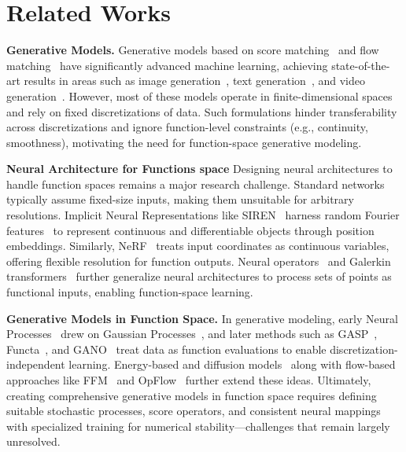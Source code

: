 \section{Related Works}

\noindent \textbf{Generative Models.}
Generative models based on score matching~\cite{ho2020denoising,Song2021a} and flow matching~\cite{lipman2023flow,tong2024improving} have significantly advanced machine learning, 
achieving state-of-the-art results in areas such as image generation~\cite{rombach2022high}, text generation~\cite{gat2024discrete}, and video generation~\cite{Ho2022video,polyak2024moviegencastmedia}. 
However, most of these models operate in finite-dimensional spaces and rely on fixed discretizations of data. 
Such formulations hinder transferability across discretizations and ignore function-level constraints (e.g., continuity, smoothness), 
motivating the need for function-space generative modeling.

\noindent \textbf{Neural Architecture for Functions space}
Designing neural architectures to handle function spaces remains a major research challenge. 
Standard networks typically assume fixed-size inputs, making them unsuitable for arbitrary resolutions. 
Implicit Neural Representations like SIREN~\cite{sitzmann2020implicit} harness random Fourier features~\cite{rahimi2007random} to represent continuous and differentiable objects through position embeddings. 
Similarly, NeRF~\cite{mildenhall2021nerf} treats input coordinates as continuous variables, offering flexible resolution for function outputs. 
Neural operators~\cite{anandkumar2019neural,li2021fourier,Kovachki2023,azizzadenesheli2024neural} and Galerkin transformers~\cite{cao2021choose} further generalize neural architectures to process sets of points as functional inputs, enabling function-space learning.

\noindent \textbf{Generative Models in Function Space.}
In generative modeling, early Neural Processes~\cite{garnelo2018neuralprocesses,pmlr-v80-garnelo18a} drew on Gaussian Processes~\cite{rasmussen2003gaussian}, and later methods such as GASP~\cite{pmlr-v151-dupont22a}, Functa~\cite{pmlr-v162-dupont22a}, and GANO~\cite{rahman2022generative} treat data as function evaluations to enable discretization-independent learning. Energy-based and diffusion models~\cite{pmlr-v206-lim23a,pmlr-v206-kerrigan23a,lim2025scorebaseddiffusionmodelsfunction,pidstrigach2023infinitedimensionaldiffusionmodels,franzese2024continuous} along with flow-based approaches like FFM~\cite{pmlr-v238-kerrigan24a} and OpFlow~\cite{shi2024universal} further extend these ideas. Ultimately, creating comprehensive generative models in function space requires defining suitable stochastic processes, score operators, and consistent neural mappings with specialized training for numerical stability—challenges that remain largely unresolved.

